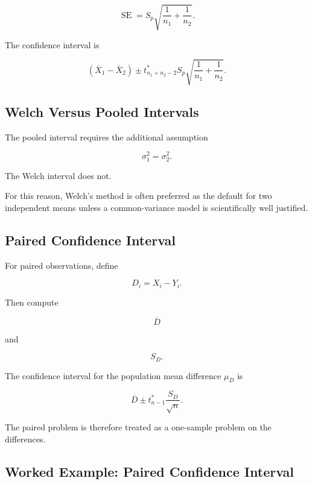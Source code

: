 \[
\boxed{
\operatorname{SE}
=
S_p
\sqrt{
\frac1{n_1}
+
\frac1{n_2}
}.
}
\]

The confidence interval is

\[
\boxed{
(\overline{X}_1-\overline{X}_2)
\pm
t^*_{n_1+n_2-2}
S_p
\sqrt{
\frac1{n_1}
+
\frac1{n_2}
}.
}
\]

\subsection{Welch Versus Pooled Intervals}
\label{subsec:welch-versus-pooled}

The pooled interval requires the additional assumption

\[
\boxed{
\sigma_1^2=\sigma_2^2.
}
\]

The Welch interval does not.

For this reason, Welch's method is often preferred as the default for
two independent means unless a common-variance model is scientifically
well justified.

\subsection{Paired Confidence Interval}
\label{subsec:paired-confidence-interval}

For paired observations, define

\[
D_i
=
X_i-Y_i.
\]

Then compute

\[
\overline{D}
\]

and

\[
S_D.
\]

The confidence interval for the population mean difference \(\mu_D\) is

\[
\boxed{
\overline{D}
\pm
t^*_{n-1}
\frac{
S_D
}{
\sqrt{n}
}.
}
\]

The paired problem is therefore treated as a one-sample problem on the
differences.

\subsection{Worked Example: Paired Confidence Interval}
\label{subsec:worked-paired-ci}

